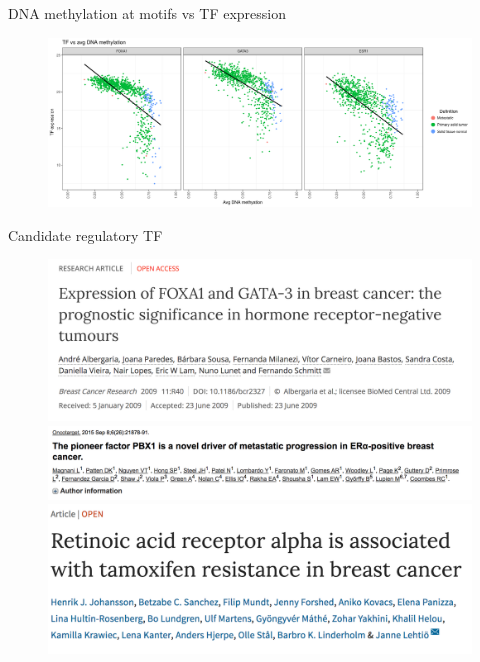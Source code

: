 \documentclass[slidestop,compress,11pt,xcolor=dvipsnames]{beamer}
\begin{document}
\begin{frame}{DNA methylation at motifs vs TF expression}
 \begin{figure}
  \centering
  \includegraphics[width=1.0\linewidth]{ELMER/BRCA_TF_scatter.png}
 \end{figure}
\end{frame}


\begin{frame}{Candidate regulatory TF}
 \vspace*{-0.3cm}
 \begin{figure}
  \centering
  \includegraphics[width=0.8\linewidth]{ELMER/paper4.png}\\
  \includegraphics[width=0.8\linewidth]{ELMER/paper1.png}\\
  \includegraphics[width=0.8\linewidth]{ELMER/paper2.png}
 \end{figure}
\end{frame}
\end{document}
